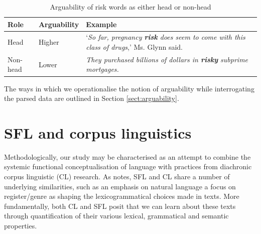     \begin{table}
    \centering
    \footnotesize
    \begin{tabularx}{.70\textwidth}{|L{.50}|L{.50}|L{2}|}%
    \hline
    \textbf{Role}              & \textbf{Arguability} & \textbf{Example} \\ \hline
    Head           & Higher   & `\emph{So far, pregnancy \textbf{risk} does seem to come with this class of drugs},' Ms. Glynn said.       \\ \hline
    Non-head   & Lower   & \emph{They purchased billions of dollars in \textbf{risky} subprime mortgages.}       \\ \hline
    \end{tabularx}
    \caption{Arguability of risk words as either head or non-head}
    \end{table}

        The ways in which we operationalise the notion of arguability while interrogating the parsed data are outlined in Section \ref{sect:arguability}.

		



	\section{SFL and corpus linguistics}

		Methodologically, our study may be characterised as an attempt to combine the systemic functional conceptualisation of language with practices from diachronic corpus linguistic (CL) research. As  notes, SFL and CL share a number of underlying similarities, such as an emphasis on natural language a focus on register\slash genre as shaping the lexicogrammatical choices made in texts. More fundamentally, both CL and SFL posit that we can learn about these texts through quantification of their various lexical, grammatical and semantic properties. %


